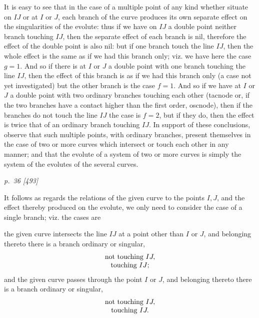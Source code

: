 ﻿\documentclass[11pt,a4paper]{article}
\theoremstyle{plain}
\theoremstyle{definition}
\begin{document}
It is easy to see that in the case of a multiple point of any kind whether
situate on \(IJ\) or at \(I\) or \(J\), each branch of the curve produces
its own separate effect on the singularities of the evolute: thus if we
have on \(IJ\) a double point neither branch touching \(IJ\), then the
separate effect of each branch is nil, therefore the effect of the double
point is also nil: but if one branch touch the line \(IJ\), then the whole
effect is the same as if we had this branch only; viz. we have here the
case \(g=1\). And so if there is at \(I\) or \(J\) a double point with one
branch touching the line \(IJ\), then the effect of this branch is as if we
had this branch only (a case not yet investigated) but the other branch is
the case \(f=1\). And so if we have at \(I\) or \(J\) a double point with
two ordinary branches touching each other (tacnode or, if the two branches
have a contact higher than the first order, oscnode), then if the branches
do not touch the line \(IJ\) the case is \(f=2\), but if they do, then the
effect is twice that of an ordinary branch touching \(IJ\). In support of
these conclusions, observe that such multiple points, with ordinary
branches, present themselves in the case of two or more curves which
intersect or touch each other in any manner; and that the evolute of a
system of two or more curves is simply the system of the evolutes of the
several curves.

\clearpage
\textit{p.~36 [493]}

It follows as regards the relations of the given curve to the points
\(I,J\), and the effect thereby produced on the evolute, we only need to
consider the case of a single branch; viz. the cases are
\begin{center}
\begin{minipage}{0.78\linewidth}
the given curve intersects the line \(IJ\) at a point other than \(I\) or
\(J\), and belonging thereto there is a branch ordinary or singular,
\[
\begin{array}{c}
\hbox{not touching }IJ,\\
\hbox{touching }IJ;
\end{array}
\]
and the given curve passes through the point \(I\) or \(J\), and belonging
thereto there is a branch ordinary or singular,
\[
\begin{array}{c}
\hbox{not touching }IJ,\\
\hbox{touching }IJ.
\end{array}
\]
\end{minipage}
\end{center}
\end{document}
